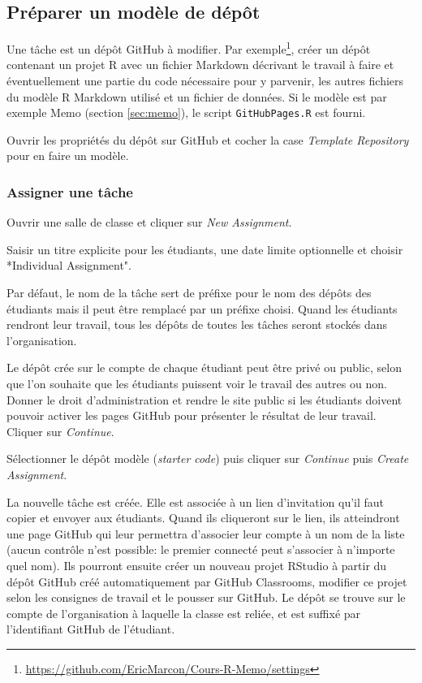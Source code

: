 \documentclass[
  12pt,
  french,
  a4paper,
  extrafontsizes,onecolumn,openright
  ]{memoir}
\begin{document}
\hypertarget{pruxe9parer-un-moduxe8le-de-duxe9puxf4t}{%
\subsection{Préparer un modèle de dépôt}\label{pruxe9parer-un-moduxe8le-de-duxe9puxf4t}}

Une tâche est un dépôt GitHub à modifier.
Par exemple\footnote{\url{https://github.com/EricMarcon/Cours-R-Memo/settings}}, créer un dépôt contenant un projet R avec un fichier Markdown décrivant le travail à faire et éventuellement une partie du code nécessaire pour y parvenir, les autres fichiers du modèle R Markdown utilisé et un fichier de données.
Si le modèle est par exemple Memo (section \ref{sec:memo}), le script \texttt{GitHubPages.R} est fourni.

Ouvrir les propriétés du dépôt sur GitHub et cocher la case \emph{Template Repository} pour en faire un modèle.

\hypertarget{assigner-une-tuxe2che}{%
\subsubsection{Assigner une tâche}\label{assigner-une-tuxe2che}}

Ouvrir une salle de classe et cliquer sur \emph{New Assignment}.

Saisir un titre explicite pour les étudiants, une date limite optionnelle et choisir *Individual Assignment".

Par défaut, le nom de la tâche sert de préfixe pour le nom des dépôts des étudiants mais il peut être remplacé par un préfixe choisi.
Quand les étudiants rendront leur travail, tous les dépôts de toutes les tâches seront stockés dans l'organisation.

Le dépôt crée sur le compte de chaque étudiant peut être privé ou public, selon que l'on souhaite que les étudiants puissent voir le travail des autres ou non.
Donner le droit d'administration et rendre le site public si les étudiants doivent pouvoir activer les pages GitHub pour présenter le résultat de leur travail.
Cliquer sur \emph{Continue}.

Sélectionner le dépôt modèle (\emph{starter code}) puis cliquer sur \emph{Continue} puis \emph{Create Assignment}.

La nouvelle tâche est créée.
Elle est associée à un lien d'invitation qu'il faut copier et envoyer aux étudiants.
Quand ils cliqueront sur le lien, ils atteindront une page GitHub qui leur permettra d'associer leur compte à un nom de la liste (aucun contrôle n'est possible: le premier connecté peut s'associer à n'importe quel nom).
Ils pourront ensuite créer un nouveau projet RStudio à partir du dépôt GitHub créé automatiquement par GitHub Classrooms, modifier ce projet selon les consignes de travail et le pousser sur GitHub.
Le dépôt se trouve sur le compte de l'organisation à laquelle la classe est reliée, et est suffixé par l'identifiant GitHub de l'étudiant.
\end{document}
